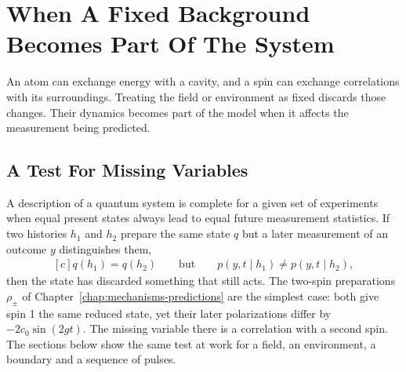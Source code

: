 \documentclass[11pt,oneside]{book}
\newenvironment{centeredalign}{\[\begin{gathered}[c]}{\end{gathered}\]}
\begin{document}
\chapter{When A Fixed Background Becomes Part Of The System}\label{chap:background}
\begin{claimbox}
An atom can exchange energy with a cavity, and a spin can exchange
correlations with its surroundings. Treating the field or environment
as fixed discards those changes. Their dynamics becomes part of the
model when it affects the measurement being predicted.
\end{claimbox}

\section{A Test For Missing Variables}
A description of a quantum system is complete for a given set of experiments when equal present states always lead to
equal future measurement statistics. If two histories \(h_1\) and \(h_2\) prepare the same state \(q\) but a later
measurement of an outcome \(y\) distinguishes them,
\begin{centeredalign}
q(h_1)=q(h_2)\qquad\text{but}\qquad p(y,t\mid h_1)\ne p(y,t\mid h_2),
\end{centeredalign}
then the state has discarded something that still acts. The two-spin preparations \(\rho_\pm\) of
Chapter~\ref{chap:mechanisms-predictions} are the simplest case: both give spin 1 the same reduced state, yet their
later polarizations differ by \(-2c_0\sin(2gt)\). The missing variable there is a correlation with a second spin. The
sections below show the same test at work for a field, an environment, a boundary and a sequence of pulses.
\end{document}
